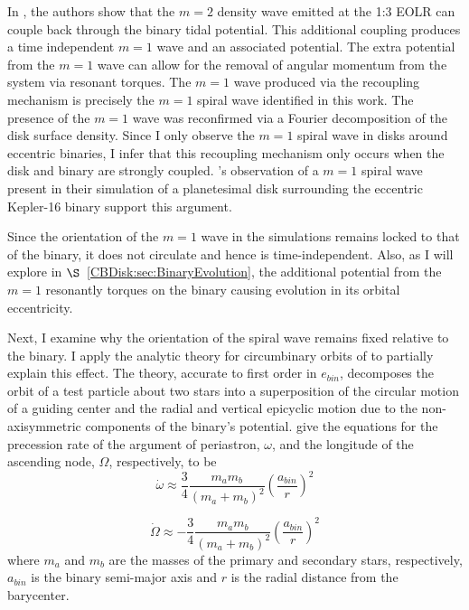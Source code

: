 In \citet{Papaloizou2001}, the authors show that the $m=2$ density wave
emitted at the 1:3 EOLR can couple back through the binary tidal potential. This additional coupling produces a time independent $m = 1$ wave and an associated potential.  The extra potential from the $m = 1$ wave can allow for the removal of angular momentum from the system via resonant torques.  The $m = 1$ wave produced via the recoupling mechanism is precisely the $m = 1$ spiral wave identified in this work.  The presence of the $m = 1$ wave was reconfirmed via a Fourier decomposition of the disk surface density.  Since I only observe the $m = 1$ spiral wave in disks around eccentric binaries, I infer that this recoupling mechanism only occurs when the disk and binary are strongly coupled.  \citet{Lines2016}'s observation of a $m = 1$ spiral wave present in their simulation of a planetesimal disk surrounding the eccentric Kepler-16 binary support this argument.

Since the orientation of the $m = 1$ wave in the simulations remains locked to that of the binary, it does not circulate and hence is time-independent.  Also, as I will explore in $\S$~\ref{CBDisk:sec:BinaryEvolution}, the additional potential from the $m = 1$ resonantly torques on the binary causing evolution in its orbital eccentricity.  

Next, I examine why the orientation of the spiral wave remains fixed relative to the binary.  I apply the analytic theory for circumbinary orbits of \citet{Leung2013} to partially explain this effect.  The theory, accurate to first order in $e_{bin}$, decomposes the orbit of a test particle about two stars into a superposition of the circular motion of a guiding center and the radial and vertical epicyclic motion due to the non-axisymmetric components of the binary's potential.  \citet{Leung2013} give the equations for the precession rate of the argument of periastron, $\omega$, and the longitude of the ascending node, $\Omega$, respectively, to be
\begin{equation}
\label{CBDisk:eqn:Periastron}
\dot{\omega} \approx \frac{3}{4} \frac{m_a m_b}{(m_a + m_b)^2} \left( \frac{a_{bin}}{r} \right)^2
\end{equation}

\begin{equation}
\label{CBDisk:eqn:Longitude}
\dot{\Omega} \approx -\frac{3}{4} \frac{m_a m_b}{(m_a + m_b)^2} \left( \frac{a_{bin}}{r} \right)^2
\end{equation}
where $m_a$ and $m_b$ are the masses of the primary and secondary stars, respectively, $a_{bin}$ is the binary semi-major
axis and $r$ is the radial distance from the barycenter. 

